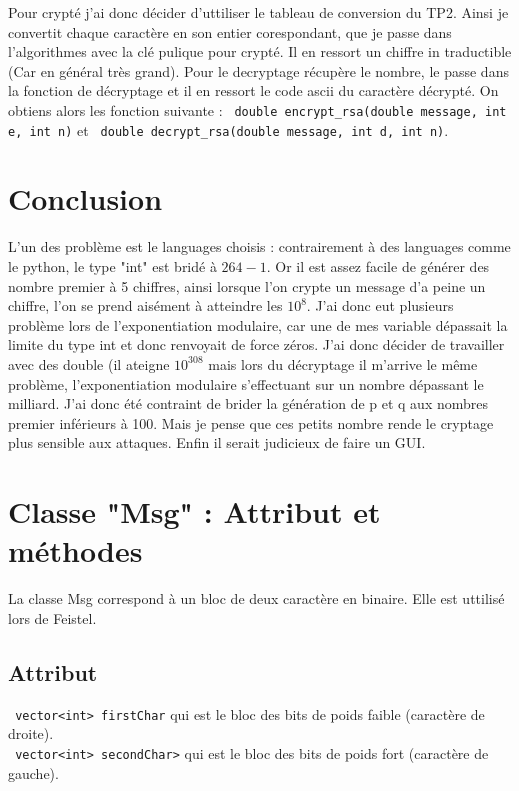 \documentclass[10pt,a4paper]{article}
\begin{document}
Pour crypté j'ai donc décider d'uttiliser le tableau de conversion du TP2. Ainsi je convertit chaque caractère en son entier corespondant, que je passe dans l'algorithmes avec la clé pulique pour crypté. Il en ressort un chiffre in traductible (Car en général très grand). Pour le decryptage récupère le nombre, le passe dans la fonction de décryptage et il en ressort le code ascii du caractère décrypté. On obtiens alors les fonction suivante : \verb| double encrypt_rsa(double message, int e, int n)| et \verb| double decrypt_rsa(double message, int d, int n)|.
\section{Conclusion}
L'un des problème est le languages choisis : contrairement à des languages comme le python, le type "int" est bridé à $2{64}-1$. Or il est assez facile de générer des nombre premier à 5 chiffres, ainsi lorsque l'on crypte un message d'a peine un chiffre, l'on se prend aisément à atteindre les $10^8$. J'ai donc eut plusieurs problème lors de l'exponentiation modulaire, car une de mes variable dépassait la limite du type int et donc renvoyait de force zéros. J'ai donc décider de travailler avec des double (il ateigne $10^{308}$ mais lors du décryptage il m'arrive le même problème, l'exponentiation modulaire s'effectuant sur un nombre dépassant le milliard. J'ai donc été contraint de brider la génération de p et q aux nombres premier inférieurs à 100. Mais je pense que ces petits nombre rende le cryptage plus sensible aux attaques.
Enfin il serait judicieux de faire un GUI.
\newpage
\appendix
\section{Classe "Msg" : Attribut et méthodes \label{msg}}
La classe Msg correspond à un bloc de deux caractère en binaire. Elle est uttilisé lors de Feistel.
\subsection*{Attribut}
\verb| vector<int> firstChar| qui est le bloc des bits de poids faible (caractère de droite).\\
\verb| vector<int> secondChar>| qui est le bloc des bits de poids fort (caractère de gauche).
\end{document}
